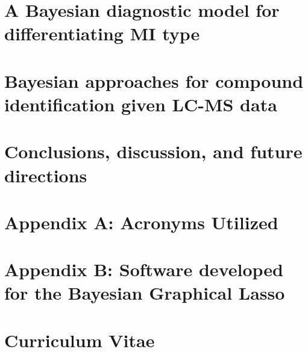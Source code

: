 \documentclass[final]{ulthesis}
\begin{document}
\chapter{A Bayesian diagnostic model for differentiating MI type}


\chapter{Bayesian approaches for compound identification given LC-MS data}


\chapter{Conclusions, discussion, and future directions} 



\backmatter
\begin{DoubleSpace*}


%
%


\end{DoubleSpace*}

\chapter{Appendix A: Acronyms Utilized}


\chapter{Appendix B: Software developed for the Bayesian Graphical Lasso}


\chapter{Curriculum Vitae}
\begin{DoubleSpace*}

\end{DoubleSpace*}
\end{document}
